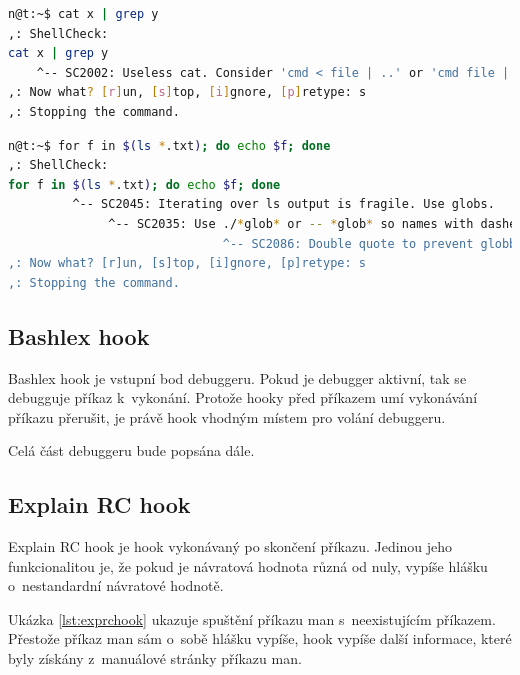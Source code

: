 \documentclass[thesis=M,czech]{FITthesis}[2012/06/26]
\begin{document}
\noindent
\begin{minipage}{\linewidth}
\begin{lstlisting}[language=bash, caption={ShellCheck}, label={lst:sccat}]
n@t:~$ cat x | grep y
,: ShellCheck:
cat x | grep y
    ^-- SC2002: Useless cat. Consider 'cmd < file | ..' or 'cmd file | ..' instead.
,: Now what? [r]un, [s]top, [i]gnore, [p]retype: s
,: Stopping the command.
\end{lstlisting}
\end{minipage}

\noindent
\begin{minipage}{\linewidth}
\begin{lstlisting}[language=bash, caption={ShellCheck}, label={lst:csfor}]
n@t:~$ for f in $(ls *.txt); do echo $f; done
,: ShellCheck:
for f in $(ls *.txt); do echo $f; done
         ^-- SC2045: Iterating over ls output is fragile. Use globs.
              ^-- SC2035: Use ./*glob* or -- *glob* so names with dashes won't become options.
                              ^-- SC2086: Double quote to prevent globbing and word splitting.
,: Now what? [r]un, [s]top, [i]gnore, [p]retype: s
,: Stopping the command.

\end{lstlisting}
\end{minipage}







\subsection{Bashlex hook}

Bashlex hook je vstupní bod debuggeru. Pokud je debugger aktivní, tak se debugguje příkaz k~vykonání. Protože hooky před příkazem umí vykonávání příkazu přerušit, je právě hook vhodným místem pro volání debuggeru.

Celá část debuggeru bude popsána dále.

\subsection{Explain RC hook}

Explain RC hook je hook vykonávaný po skončení příkazu. Jedinou jeho funkcionalitou je, že pokud je návratová hodnota různá od nuly, vypíše hlášku o~nestandardní návratové hodnotě.

Ukázka \ref{lst:exprchook} ukazuje spuštění příkazu man s~neexistujícím příkazem. Přestože příkaz man sám o~sobě hlášku vypíše, hook vypíše další informace, které byly získány z~manuálové stránky příkazu man.
\end{document}
